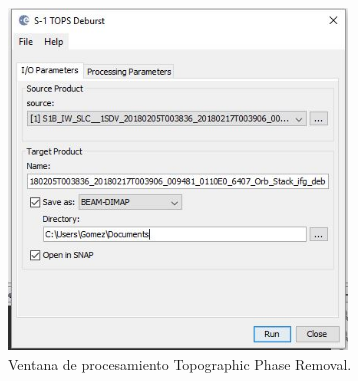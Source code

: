 \documentclass{article}
\begin{document}
\begin{figure}[htbp]
    \centering
    \includegraphics[width=9cm]{Imagen/09.JPG}
    \caption{Ventana de procesamiento Topographic Phase Removal.}
    \label{fig:07}
    \end{figure}
\end{document}
